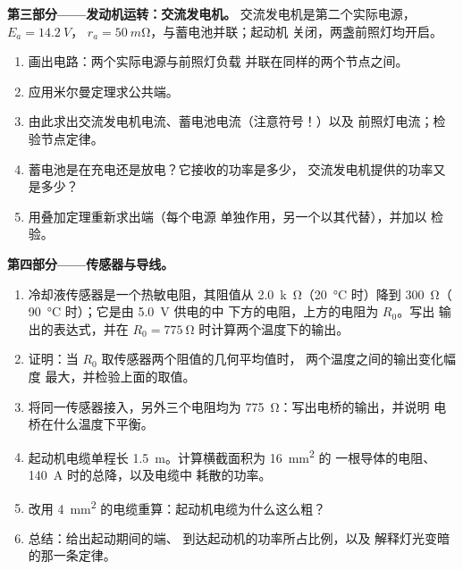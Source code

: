 \begin{problem}
\medskip
\noindent\textbf{第三部分——发动机运转：交流发电机。}
交流发电机是第二个实际电源，$E_a = \qty{14.2}{V}$，
$r_a = \qty{50}{m\ohm}$，与蓄电池并联；起动机
关闭，两盏前照灯均开启。
\begin{enumerate}[resume]
  \item 画出电路：两个实际电源与前照灯负载
        并联在同样的两个节点之间。
  \item 应用米尔曼定理求公共端。
  \item 由此求出交流发电机电流、蓄电池电流（注意符号！）以及
        前照灯电流；检验节点定律。
  \item 蓄电池是在充电还是放电？它接收的功率是多少，
        交流发电机提供的功率又是多少？
  \item 用叠加定理重新求出端（每个电源
        单独作用，另一个以其代替），并加以
        检验。
\end{enumerate}

\medskip
\noindent\textbf{第四部分——传感器与导线。}
\begin{enumerate}[resume]
  \item 冷却液传感器是一个热敏电阻，其阻值从
        \qty{2.0}{k\ohm}（\qty{20}{\degreeCelsius} 时）降到 \qty{300}{\ohm}（
        \qty{90}{\degreeCelsius} 时）；它是由 \qty{5.0}{V} 供电的中
        下方的电阻，上方的电阻为 $R_0$。写出
        输出的表达式，并在
        $R_0 = \qty{775}{\ohm}$ 时计算两个温度下的输出。
  \item 证明：当 $R_0$ 取传感器两个阻值的几何平均值时，
        两个温度之间的输出变化幅度
        最大，并检验上面的取值。
  \item 将同一传感器接入，另外三个电阻均为
        \qty{775}{\ohm}：写出电桥的输出，并说明
        电桥在什么温度下平衡。
  \item 起动机电缆单程长 \qty{1.5}{m}。计算横截面积为 \qty{16}{mm^2} 的
        一根导体的电阻、
        \qty{140}{A} 时的总降，以及电缆中
        耗散的功率。
  \item 改用 \qty{4}{mm^2} 的电缆重算：起动机电缆为什么这么粗？
  \item 总结：给出起动期间的端、
        到达起动机的功率所占比例，以及
        解释灯光变暗的那一条定律。
\end{enumerate}
\end{problem}
